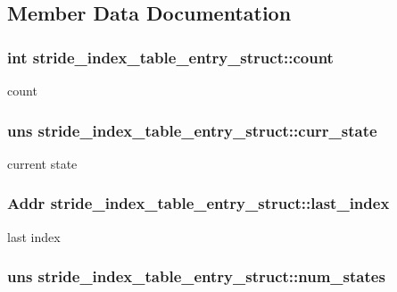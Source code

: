 \subsection{Member Data Documentation}
\hypertarget{structstride__index__table__entry__struct_a65b6f602ef126135ee7fe18e1d9bb88a}{
\subsubsection[{count}]{\setlength{\rightskip}{0pt plus 5cm}int {\bf stride\_\-index\_\-table\_\-entry\_\-struct::count}}}
\label{structstride__index__table__entry__struct_a65b6f602ef126135ee7fe18e1d9bb88a}
count \hypertarget{structstride__index__table__entry__struct_a96f5b8ed397a7057a53c529c912f4636}{
\subsubsection[{curr\_\-state}]{\setlength{\rightskip}{0pt plus 5cm}uns {\bf stride\_\-index\_\-table\_\-entry\_\-struct::curr\_\-state}}}
\label{structstride__index__table__entry__struct_a96f5b8ed397a7057a53c529c912f4636}
current state \hypertarget{structstride__index__table__entry__struct_a9da024a8acaedce97de3a3300a3b523f}{
\subsubsection[{last\_\-index}]{\setlength{\rightskip}{0pt plus 5cm}Addr {\bf stride\_\-index\_\-table\_\-entry\_\-struct::last\_\-index}}}
\label{structstride__index__table__entry__struct_a9da024a8acaedce97de3a3300a3b523f}
last index \hypertarget{structstride__index__table__entry__struct_aa70fb619383a85c1043a77d156896ba4}{
\subsubsection[{num\_\-states}]{\setlength{\rightskip}{0pt plus 5cm}uns {\bf stride\_\-index\_\-table\_\-entry\_\-struct::num\_\-states}}}
